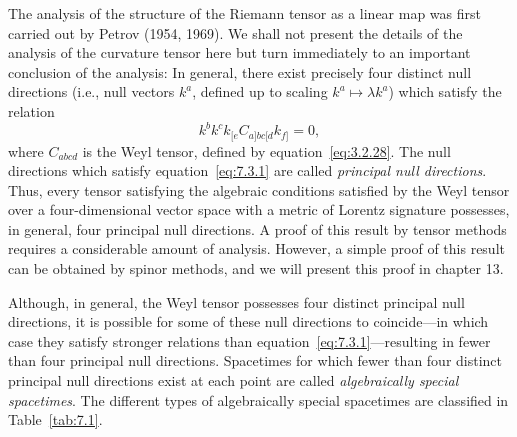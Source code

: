 The analysis of the structure of the Riemann tensor as a linear map was first carried
out by Petrov (1954, 1969). We shall not present the details of the analysis of the
curvature tensor here but turn immediately to an important conclusion of the
analysis: In general, there exist precisely four distinct null directions (i.e., null
vectors \(k^a\), defined up to scaling \(k^a\longmapsto\lambda k^a\)) which
satisfy the relation
\begin{equation}
  k^bk^ck_{[e}C_{a]bc[d}k_{f]}=0 ,
  \tag{7.3.1}\label{eq:7.3.1}
\end{equation}
where \(C_{abcd}\) is the Weyl tensor, defined by equation~\eqref{eq:3.2.28}.
The null directions which satisfy equation~\eqref{eq:7.3.1} are called
\emph{principal null directions}. Thus, every tensor satisfying the algebraic
conditions satisfied by the Weyl tensor over a four-dimensional vector space with a
metric of Lorentz signature possesses, in general, four principal null directions. A
proof of this result by tensor methods requires a considerable amount of analysis.
However, a simple proof of this result can be obtained by spinor methods, and we
will present this proof in chapter 13.

Although, in general, the Weyl tensor possesses four distinct principal null
directions, it is possible for some of these null directions to coincide---in which
case they satisfy stronger relations than equation~\eqref{eq:7.3.1}---resulting in
fewer than four principal null directions. Spacetimes for which fewer than four
distinct principal null directions exist at each point are called \emph{algebraically
special spacetimes}. The different types of algebraically special spacetimes are
classified in Table~\ref{tab:7.1}.

